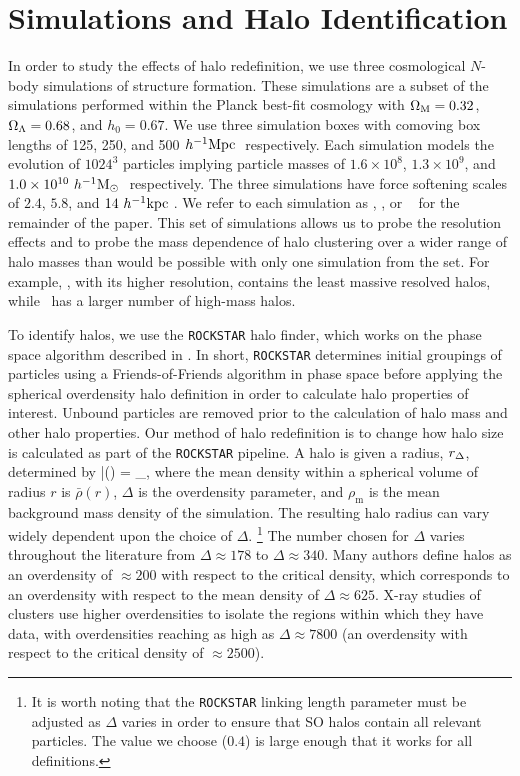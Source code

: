 \documentclass[usenatbib,fleqn]{mnras}
\begin{document}
\section[]{Simulations and Halo Identification}
\label{section:data}


In order to study the effects of halo redefinition, we use three cosmological $N$-body simulations of structure formation. These simulations are a subset of the  \citet{diemer_kravtsov15} simulations performed within the Planck best-fit cosmology with $\Omega_{\mathrm{M}} = 0.32$, $\Omega_{\Lambda} = 0.68$, and $h_0 = 0.67$. We use three simulation boxes with comoving box lengths of 125, 250, and 500$\ h^{-1}\mathrm{Mpc}~$ respectively. Each simulation models the evolution of $1024^3$ particles implying particle masses of $1.6 \times 10^8$, $1.3 \times 10^9$, and $1.0 \times 10^{10}\ h^{-1}\mathrm{M}_{\odot}~$ respectively. The three simulations have force softening scales of $2.4$, $5.8$, and $14 \ h^{-1}\mathrm{kpc}~$. We refer to each simulation as
\simA, \simB, or \simC~ for the remainder of the paper. This set of simulations allows us to probe the resolution effects and to probe the mass dependence of halo clustering over a wider range of halo masses than would be possible with only one simulation from the set. For example, \simA, with its higher resolution, contains the least massive resolved halos, while \simC~has a larger number of high-mass halos.

To identify halos, we use the {\tt ROCKSTAR} halo finder, which works on the phase space algorithm described in \citet*{behroozi_etal13a}. In short, {\tt ROCKSTAR} determines initial groupings of particles using a Friends-of-Friends algorithm in phase space before applying the spherical overdensity halo definition in order to calculate halo properties of interest. Unbound particles are removed prior to the calculation of halo mass and other halo properties. Our method of halo redefinition is to change how halo size is calculated as part of the {\tt ROCKSTAR} pipeline. A halo is given a radius, $r_{\Delta}$, determined by
\beq
	\bar{\rho}(\Rdel) = \Delta \rho_{}, 
\eeq
where the mean density within a spherical volume of radius $r$ is $\bar{\rho}(r)$, $\Delta$ is the overdensity parameter, and $\rho_{\mathrm{m}}$ is the mean background mass density of the simulation. The resulting halo radius can vary widely dependent upon the choice of $\Delta$. \footnote{It is worth noting that the {\tt ROCKSTAR} linking length parameter must be adjusted as $\Delta$ varies in order to ensure that SO halos contain all relevant particles. The value we choose ($0.4$) is large enough that it works for all definitions.} The number chosen for $\Delta$ varies throughout the literature from $\Delta \approx 178$ to $\Delta \approx 340$. Many authors define halos as an overdensity of $\approx 200$ with respect to the critical density, which corresponds to an overdensity with respect to the mean density of $\Delta \approx 625$. X-ray studies of clusters use higher overdensities to isolate the regions within which they have data, with overdensities reaching as high as $\Delta \approx 7800$ (an overdensity with respect to the critical density of $\approx 2500$). 
\end{document}
